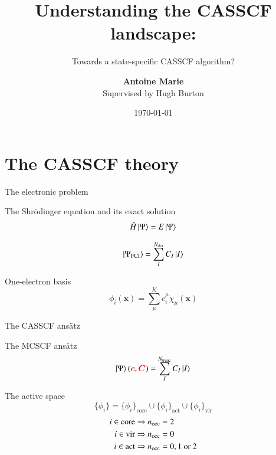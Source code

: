\documentclass[10pt]{beamer}
\title{Understanding the CASSCF landscape:}
\subtitle{Towards a state-specific CASSCF algorithm?}
\date{\today}
\author{\textbf{Antoine Marie} \\
Supervised by Hugh Burton}
\institute{ENS de Lyon/University of Oxford}
\begin{document}
\maketitle

\section{The CASSCF theory}

\begin{frame}{The electronic problem}
  \pause[1]
  \begin{block}{The Shr\"odinger equation and its exact solution}
    \begin{equation}
      \Hat{H} \ket{\Psi} = E \ket{\Psi}
    \end{equation}

    \begin{equation}
      \label{eq:fci_wf}
      \ket{\Psi_{\text{FCI}}} = \sum_I^{N_{det}} C_I\ket{I}
    \end{equation}
  \end{block}
  \pause[2]
  \begin{block}{One-electron basis}
    \begin{equation}
      \label{eq:MO}
      \phi_i(\bm{x}) = \sum^K_\mu c_i^\mu \chi_{\mu}(\bm{x})
    \end{equation}
  \end{block}
\end{frame}

\begin{frame}{The CASSCF ans\"atz}
  \pause[1]
  \begin{block}{The MCSCF ans\"atz}
    \begin{equation}
      \ket{\Psi}(\textcolor{red}{\bm{c}},\textcolor{red}{\bm{C}}) = \sum_I^{N_\text{trunc}} C_I\ket{I}
    \end{equation}
  \end{block}
  \pause[2]
  \begin{block}{The active space}
    \begin{equation*}
      \{\phi_i\} = \{\phi_i\}_{\text{core}}\cup \{\phi_i\}_{\text{act}}\cup \{\phi_i\}_{\text{vir}}
    \end{equation*}
    \begin{align}
      i \in \text{core} &\Rightarrow n_{\text{occ}}=2 \notag \\
      i \in \text{vir} &\Rightarrow n_{\text{occ}}=0 \notag \\
      i \in \text{act} &\Rightarrow n_{\text{occ}}=0,1~\text{or}~2 \notag
    \end{align}
  \end{block}
\end{frame}
\end{document}
